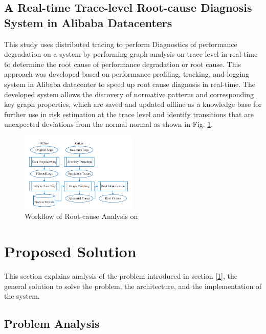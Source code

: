 \documentclass[conference]{configs/IEEEtran}
\begin{document}
\subsection{A Real-time Trace-level Root-cause Diagnosis System in Alibaba Datacenters}
This study \cite{rca-alibaba} uses distributed tracing to perform
Diagnostics of performance degradation on a system by performing graph analysis on
trace level in real-time to determine the root cause of performance degradation or
root cause. This approach was developed based on performance profiling, tracking, and logging system in Alibaba datacenter to speed up root cause diagnosis in real-time. The developed system allows the discovery of normative patterns and corresponding key graph properties, which are saved and updated offline as a knowledge base for further use in risk estimation at the trace level and identify transitions that are unexpected deviations from the normal
normal as shown in Fig. \ref{rca-framwork}.
\begin{figure}[htb]
	\centering
	\includegraphics[width=0.5\textwidth]{resources/ch2/rca-framework.png}
	\caption{Workflow of Root-cause Analysis on \cite{rca-alibaba}}
	\label{rca-framwork}
\end{figure}

\section{Proposed Solution}
This section explains analysis of the problem introduced in section \ref{1}, the general solution to solve the problem, the architecture, and the implementation of the system.

\subsection{Problem Analysis}
\end{document}

